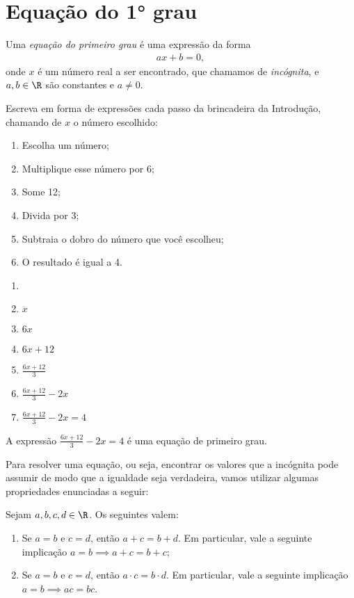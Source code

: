 \section{Equação do 1° grau}

\begin{definition}
Uma \emph{equação do primeiro grau} é uma expressão da forma
%
\begin{align*}
ax+b=0,
\end{align*}
%
onde $x$ é um número real a ser encontrado, que chamamos de \emph{incógnita}, e $a,b\in \R$ são constantes e $a \neq 0$.
\end{definition}

\begin{example}
Escreva em forma de expressões cada passo da brincadeira da Introdução, chamando de $x$ o número escolhido:
\begin{enumerate}[label=\textbf{\arabic*}.]
	\item Escolha um número;
	\item Multiplique esse número por 6;
	\item Some 12;
	\item Divida por 3;
	\item Subtraia o dobro do número que você escolheu;
	\item O resultado é igual a 4.
\end{enumerate}
\label{eq:brinc}
\end{example}

\begin{solution}
\begin{enumerate}[label=\textbf{\arabic*}.]
	\item[]
	\item $x$
	\item $6x$
	\item $6x+12$
	\item $\frac{6x+12}{3}$
	\item $\frac{6x+12}{3} - 2x$
	\item $\frac{6x+12}{3} - 2x = 4$ 
\end{enumerate}
\end{solution}

A expressão $\frac{6x+12}{3} - 2x = 4$ é uma equação de primeiro grau.

Para resolver uma equação, ou seja, encontrar os valores que a incógnita pode assumir de modo que a igualdade seja verdadeira, vamos utilizar algumas propriedades enunciadas a seguir:

\begin{proposition}[Propriedades]
\label{prop:props-eq}
Sejam $a, b, c, d \in \R$. Os seguintes valem:
\begin{enumerate}
	\item 
	\label{eq:soma} 
	Se $a = b$ e $c = d$, então $a + c = b + d$. Em particular, vale a seguinte implicação $a=b \implies a+c = b+c$;
	\item 
	\label{eq:multiplicacao}
	Se $a = b$ e $c = d$, então $a \cdot c = b \cdot d$. Em particular, vale a seguinte implicação $a=b \implies ac = bc$.
\end{enumerate}
\end{proposition}

